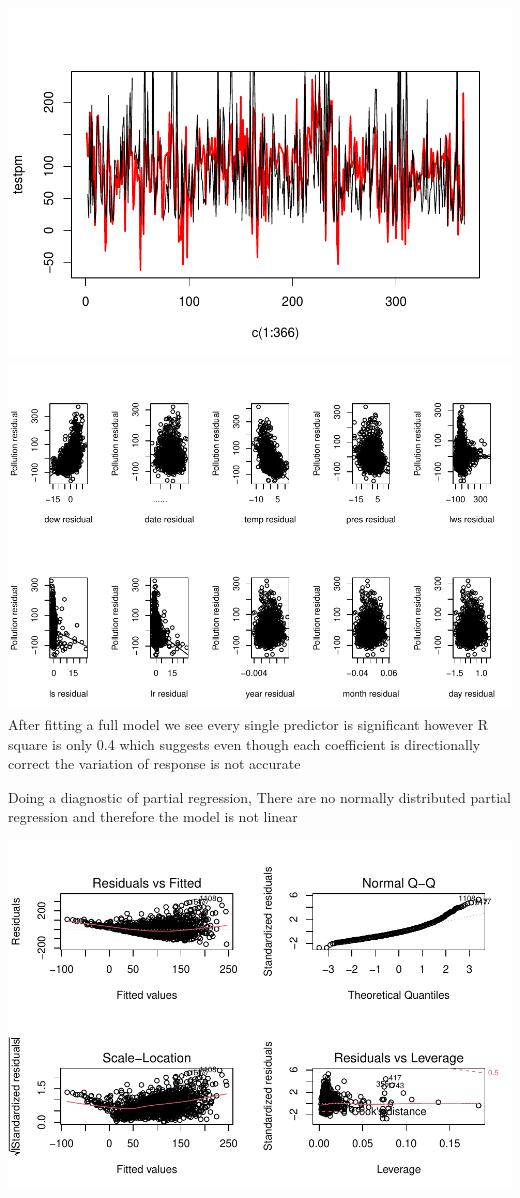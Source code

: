 \documentclass[
]{article}
\begin{document}
\includegraphics{Final_Project_1_files/figure-latex/unnamed-chunk-6-1.pdf}
\includegraphics{Final_Project_1_files/figure-latex/unnamed-chunk-6-2.pdf}
After fitting a full model we see every single predictor is significant
however R square is only 0.4 which suggests even though each coefficient
is directionally correct the variation of response is not accurate

Doing a diagnostic of partial regression, There are no normally
distributed partial regression and therefore the model is not linear

\includegraphics{Final_Project_1_files/figure-latex/unnamed-chunk-8-1.pdf}
\end{document}
